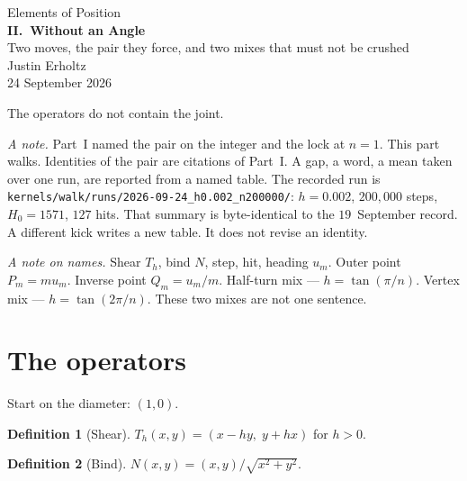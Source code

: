 \documentclass[10pt,a4paper]{article}
\theoremstyle{plain}
\theoremstyle{definition}
\newtheorem{definition}{Definition}
\theoremstyle{remark}
\begin{document}
\begin{center}
\vspace*{2.0em}
{\large Elements of Position}\\[1.5em]
{\LARGE\bfseries II.\ Without an Angle}\\[0.5em]
{\small Two moves, the pair they force, and two mixes that must not be crushed}\\[1.6em]
{\normalsize Justin Erholtz}\\[0.3em]
{\small 24 September 2026}
\end{center}

\vspace{1.2em}

\begin{center}
{\large The operators do not contain the joint.}
\end{center}

\vspace{1.0em}

\noindent
\textit{A note.}
Part~I named the pair on the integer and the lock at \(n=1\).
This part walks.
Identities of the pair are citations of Part~I.
A gap, a word, a mean taken over one run, are reported from a named table.
The recorded run is
\texttt{kernels/walk/runs/2026-09-24\_h0.002\_n200000/}:
\(h=0.002\), \(200{,}000\) steps, \(H_0=1571\), \(127\) hits.
That summary is byte-identical to the \(19\)~September record.
A different kick writes a new table.
It does not revise an identity.

\vspace{0.5em}
\noindent
\textit{A note on names.}
Shear \(T_h\), bind \(N\), step, hit, heading \(u_m\).
Outer point \(P_m=m u_m\). Inverse point \(Q_m=u_m/m\).
Half-turn mix --- \(h=\tan(\pi/n)\).
Vertex mix --- \(h=\tan(2\pi/n)\).
These two mixes are not one sentence.

\tableofcontents

\section{The operators}

Start on the diameter: \((1,0)\).

\begin{definition}[Shear]
\(T_h(x,y)=(x-hy,\; y+hx)\) for \(h>0\).
\end{definition}

\begin{definition}[Bind]
\(N(x,y)=(x,y)/\sqrt{x^2+y^2}\).
\end{definition}
\end{document}
